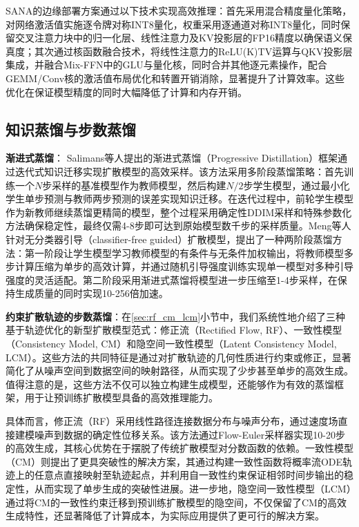 \documentclass[11pt,a4paper,UTF8]{ctexart}
\begin{document}
SANA\cite{xie2024sana}的边缘部署方案通过以下技术实现高效推理：首先采用混合精度量化策略，对网络激活值实施逐令牌对称INT8量化，权重采用逐通道对称INT8量化，同时保留交叉注意力块中的归一化层、线性注意力及KV投影层的FP16精度以确保语义保真度；其次通过核函数融合技术，将线性注意力的ReLU(K)TV运算与QKV投影层集成，并融合Mix-FFN中的GLU与量化核，同时合并其他逐元素操作，配合GEMM/Conv核的激活值布局优化和转置开销消除，显著提升了计算效率。这些优化在保证模型精度的同时大幅降低了计算和内存开销。


\subsection{知识蒸馏与步数蒸馏}

\textbf{渐进式蒸馏}： Salimans等人\cite{salimans2021progressive}提出的渐进式蒸馏（Progressive Distillation）框架通过迭代式知识迁移实现扩散模型的高效采样。该方法采用多阶段蒸馏策略：首先训练一个$N$步采样的基准模型作为教师模型，然后构建$N/2$步学生模型，通过最小化学生单步预测与教师两步预测的误差实现知识迁移。在迭代过程中，前轮学生模型作为新教师继续蒸馏更精简的模型，整个过程采用确定性DDIM\cite{song2020denoising}采样和特殊参数化方法确保稳定性，最终仅需4-8步即可达到原始模型数千步的采样质量。Meng等人\cite{meng2022distillation}针对无分类器引导（classifier-free guided）扩散模型，提出了一种两阶段蒸馏方法：第一阶段让学生模型学习教师模型的有条件与无条件加权输出，将教师模型多步计算压缩为单步的高效计算，并通过随机引导强度训练实现单一模型对多种引导强度的灵活适配。第二阶段采用渐进式蒸馏\cite{salimans2021progressive}将模型进一步压缩至1-4步采样，在保持生成质量的同时实现10-256倍加速。

\textbf{约束扩散轨迹的步数蒸馏}：在\ref{sec:rf_cm_lcm}小节中，我们系统性地介绍了三种基于轨迹优化的新型扩散模型范式：修正流（Rectified Flow, RF）\cite{liu2022flow}、一致性模型（Consistency Model, CM）\cite{pmlr-v202-song23a}和隐空间一致性模型（Latent Consistency Model, LCM）\cite{luo2023latent}。这些方法的共同特征是通过对扩散轨迹的几何性质进行约束或修正，显著简化了从噪声空间到数据空间的映射路径，从而实现了少步甚至单步的高效生成。值得注意的是，这些方法不仅可以独立构建生成模型，还能够作为有效的蒸馏框架，用于让预训练扩散模型具备的高效推理能力。

具体而言，修正流（RF）采用线性路径连接数据分布与噪声分布，通过速度场直接建模噪声到数据的确定性位移关系。该方法通过Flow-Euler采样器实现10-20步的高效生成，其核心优势在于摆脱了传统扩散模型对分数函数的依赖。一致性模型（CM）则提出了更具突破性的解决方案，其通过构建一致性函数将概率流ODE轨迹上的任意点直接映射至轨迹起点，并利用自一致性约束保证相邻时间步输出的稳定性，从而实现了单步生成的突破性进展。进一步地，隐空间一致性模型（LCM）通过将CM的一致性约束迁移到预训练扩散模型的隐空间，不仅保留了CM的高效生成特性，还显著降低了计算成本，为实际应用提供了更可行的解决方案。
\end{document}
